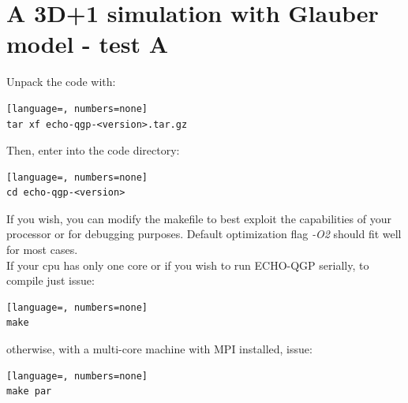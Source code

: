\section{A 3D+1 simulation with Glauber model - test A}
Unpack the code with:
\begin{lstlisting}[language=, numbers=none]
tar xf echo-qgp-<version>.tar.gz
\end{lstlisting}
Then, enter into the code directory:
\begin{lstlisting}[language=, numbers=none]
cd echo-qgp-<version>
\end{lstlisting}
If you wish, you can modify the makefile to best exploit the capabilities of your processor or for debugging purposes. Default optimization flag \emph{-O2} should fit well for most cases.\\
If your cpu has only one core or if you wish to run ECHO-QGP serially, to compile just issue:
\begin{lstlisting}[language=, numbers=none]
make
\end{lstlisting}
otherwise, with a multi-core machine with MPI installed, issue:
\begin{lstlisting}[language=, numbers=none]
make par
\end{lstlisting}

